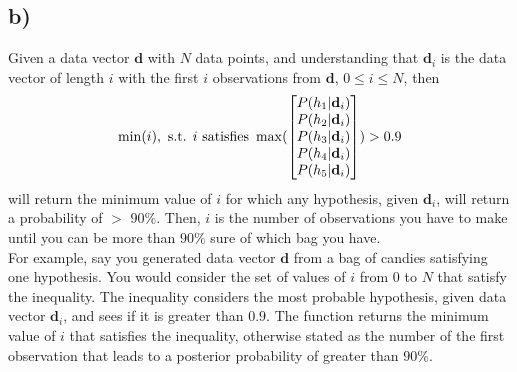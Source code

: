 \documentclass[]{article}
\begin{document}
\subsection*{b)}
Given a data vector $\textbf{d}$ with $N$ data points, and understanding that $\textbf{d}_i$ is the data vector of length $i$ with the first $i$ observations from $\textbf{d}$, $0\leq i \leq N$, then
$$\min(i), \text{ s.t. } i\text{ satisfies }\max(\begin{bmatrix} P(h_1|\textbf{d}_i)\\ P(h_2|\textbf{d}_i)\\ P(h_3|\textbf{d}_i)\\ P(h_4|\textbf{d}_i)\\ P(h_5|\textbf{d}_i)\\\end{bmatrix})> 0.9$$
will return the minimum value of $i$ for which any hypothesis, given $\textbf{d}_i$, will return a probability of $>$ $90\%$.  Then, $i$ is the number of observations you have to make until you can be more than $90\%$ sure of which bag you have.\\  
\linebreak
For example, say you generated data vector $\textbf{d}$ from a bag of candies satisfying one hypothesis.  You would consider the set of values of $i$ from $0$ to $N$ that satisfy the inequality.  The inequality considers the most probable hypothesis, given data vector $\textbf{d}_i$, and sees if it is greater than $0.9$. The function returns the minimum value of $i$ that satisfies the inequality, otherwise stated as the number of the first observation that leads to a posterior probability of greater than $90\%$.
\end{document}
